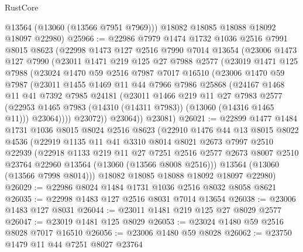 \begin{lexlean}{RustCore}
\begin{coremodule}
        @13564
        (@13060 (@13566 @7951 @7969)))
      @18082
      @18085
      @18088
      @18092
      @18097
      @22980)
@25966 := @22986
    @7979
    @1474
    @1732
    @1036
    @2516
    @7991
    @8015
    @8623
    (@22998
      @1473
      @127
      @2516
      @7990
      @7014
      @13654
      (@23006
        @1473
        @127
        @7990
        (@23011
          @1471
          @219
          @125
          @27
          @7988
          @2577
          (@23019
            @1471
            @125
            @7988
            (@23024
              @1470
              @59
              @2516
              @7987
              @7017
              @16510
              (@23006
                @1470
                @59
                @7987
                (@23011
                  @1455
                  @1469
                  @11
                  @44
                  @7966
                  @7986
                  @25868
                  (@24167
                    @1468
                    @11
                    @41
                    @7392
                    @7985
                    @24181
                    (@23011
                      @1466
                      @219
                      @11
                      @27
                      @7983
                      @2577
                      (@22953 @1465 @7983 (@14310 (@14311 @7983)) (@13060 (@14316 @1465 @11)))
                      @23064))))
              @23072))
          @23064))
      @23081)
@26021 := @22899
    @1477
    @1484
    @1731
    @1036
    @8015
    @8024
    @2516
    @8623
    (@22910
      @1476
      @44
      @13
      @8015
      @8022
      @4536
      (@22919
        @1135
        @11
        @41
        @3310
        @8014
        @8021
        @2673
        @7997
        @2510
        @22939
        (@22918
          @1133
          @219
          @11
          @27
          @7251
          @2516
          @2577
          @2673
          @8007
          @2510
          @23764
          @22960
          @13564
          (@13060 (@13566 @8008 @2516)))
        @13564
        (@13060 (@13566 @7998 @8014)))
      @18082
      @18085
      @18088
      @18092
      @18097
      @22980)
@26029 := @22986 @8024 @1484 @1731 @1036 @2516 @8032 @8058 @8621
@26035 := @22998 @1483 @127 @2516 @8031 @7014 @13654
@26038 := @23006 @1483 @127 @8031
@26044 := @23011 @1481 @219 @125 @27 @8029 @2577
@26047 := @23019 @1481 @125 @8029
@26053 := @23024 @1480 @59 @2516 @8028 @7017 @16510
@26056 := @23006 @1480 @59 @8028
@26062 := @23750 @1479 @11 @44 @7251 @8027 @23764

\end{coremodule}
\end{lexlean}
